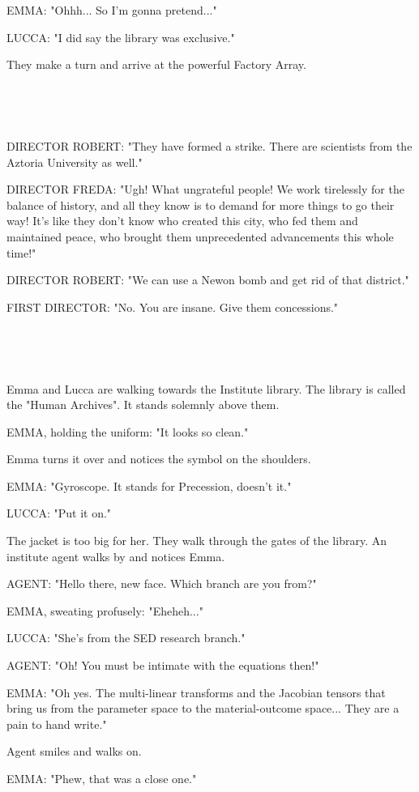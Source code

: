 \documentclass[11pt]{article}
\begin{document}
EMMA: "Ohhh... So I'm gonna pretend..."

LUCCA: "I did say the library was exclusive."

They make a turn and arrive at the powerful Factory Array.

\ 

\ 

DIRECTOR ROBERT: "They have formed a strike.
There are scientists from the Aztoria University as well."

DIRECTOR FREDA: "Ugh! What ungrateful people! 
We work tirelessly for the balance of history, and all they know is to demand for more things to go their way!
It's like they don't know who created this city, who fed them and maintained peace, who brought them unprecedented advancements this whole time!"

DIRECTOR ROBERT: "We can use a Newon bomb and get rid of that district."

FIRST DIRECTOR: "No. You are insane.
Give them concessions."

\ 

\ 

Emma and Lucca are walking towards the Institute library.
The library is called the "Human Archives".
It stands solemnly above them.

EMMA, holding the uniform: "It looks so clean."

Emma turns it over and notices the symbol on the shoulders.

EMMA: "Gyroscope. It stands for Precession, doesn't it."

LUCCA: "Put it on."

The jacket is too big for her.
They walk through the gates of the library.
An institute agent walks by and notices Emma.

AGENT: "Hello there, new face. Which branch are you from?"

EMMA, sweating profusely: "Eheheh..."

LUCCA: "She's from the SED research branch."

AGENT: "Oh! You must be intimate with the equations then!"

EMMA: "Oh yes. 
The multi-linear transforms and the Jacobian tensors that bring us from the parameter space to the material-outcome space...
They are a pain to hand write."

Agent smiles and walks on.

EMMA: "Phew, that was a close one."

\ 
\end{document}

